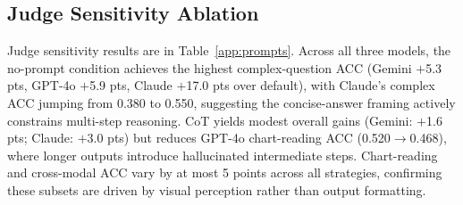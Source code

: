\documentclass{article} %
\begin{document}
\begin{table}[htbp]
\centering
\begin{minipage}[t]{0.48\textwidth}
\centering
{}
\caption{Judge sensitivity ablation configuration.}
\label{tab:ablation_config}
\end{minipage}
\hfill
\begin{minipage}[t]{0.48\textwidth}
\centering
{}
\caption{Prompting ablation configuration.}
\label{tab:ablation_prompt}
\end{minipage}
\end{table}

\subsection{Judge Sensitivity Ablation}
\label{app:abl_judge}
\label{app:judge_sensitivity}

Judge sensitivity results are in Table~\ref{app:prompts}.
Across all three models, the no-prompt condition achieves the highest complex-question ACC
(Gemini $+$5.3 pts, GPT-4o $+$5.9 pts, Claude $+$17.0 pts over default),
with Claude's complex ACC jumping from 0.380 to 0.550, suggesting the concise-answer
framing actively constrains multi-step reasoning.
CoT yields modest overall gains (Gemini: $+$1.6 pts; Claude: $+$3.0 pts) but reduces
GPT-4o chart-reading ACC (0.520$\to$0.468), where longer outputs introduce hallucinated
intermediate steps.
Chart-reading and cross-modal ACC vary by at most 5 points across all strategies,
confirming these subsets are driven by visual perception rather than output formatting.
\end{document}
